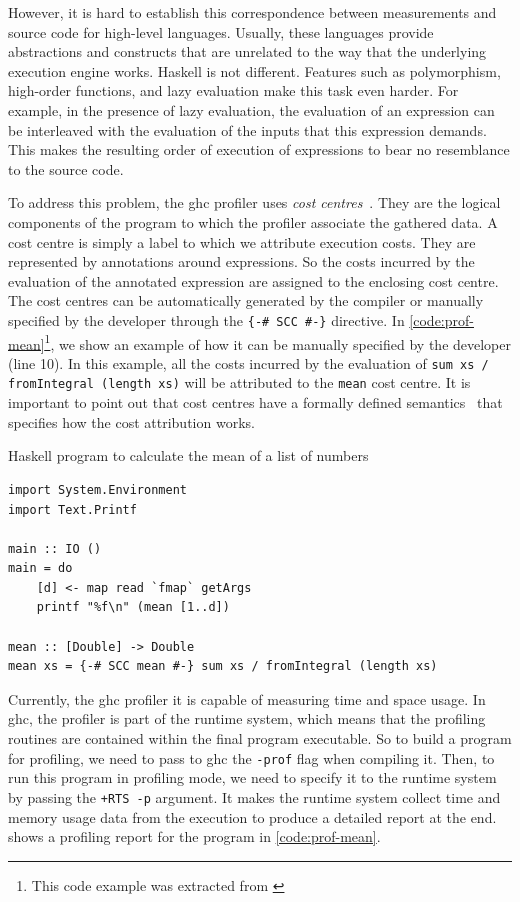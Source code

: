 However, it is hard to establish this correspondence between measurements and source code for high-level languages. Usually, these languages provide abstractions and constructs that are unrelated to the way that the underlying execution engine works. Haskell is not different. Features such as polymorphism, high-order functions, and lazy evaluation make this task even harder. For example, in the presence of lazy evaluation, the evaluation of an expression can be interleaved with the evaluation of the inputs that this expression demands. This makes the resulting order of execution of expressions to bear no resemblance to the source code.

To address this problem, the \ac{ghc} profiler uses \emph{cost centres}~\citep{sansom:1995}. They are the logical components of the program to which the profiler associate the gathered data. A cost centre is simply a label to which we attribute execution costs. They are represented by annotations around expressions. So the costs incurred by the evaluation of the annotated expression are assigned to the enclosing cost centre. The cost centres can be automatically generated by the compiler or manually specified by the developer through the \texttt{\{-\# SCC \#-\}} directive. In \autoref{code:prof-mean}\footnote{This code example was extracted from \cite{sullivan:2008}}, we show an example of how it can be manually specified by the developer (line 10). In this example, all the costs incurred by the evaluation of \texttt{sum xs / fromIntegral (length xs)} will be attributed to the \texttt{mean} cost centre. It is important to point out that cost centres have a formally defined semantics~\citep{sansom:1995} that specifies how the cost attribution works.

\begin{listing}
  \caption{Haskell program to calculate the mean of a list of numbers}
  \begin{verbatim}
import System.Environment
import Text.Printf

main :: IO ()
main = do
    [d] <- map read `fmap` getArgs
    printf "%f\n" (mean [1..d])

mean :: [Double] -> Double
mean xs = {-# SCC mean #-} sum xs / fromIntegral (length xs)
  \end{verbatim}
  \label{code:prof-mean}
\end{listing}

Currently, the \ac{ghc} profiler it is capable of measuring time and space usage. In \ac{ghc}, the profiler is part of the runtime system, which means that the profiling routines are contained within the final program executable. So to build a program for profiling, we need to pass to \ac{ghc} the \texttt{-prof} flag when compiling it. Then, to run this program in profiling mode, we need to specify it to the runtime system by passing the \texttt{+RTS -p} argument. It makes the runtime system collect time and memory usage data from the execution to produce a detailed report at the end.  shows a profiling report for the program in \autoref{code:prof-mean}.


